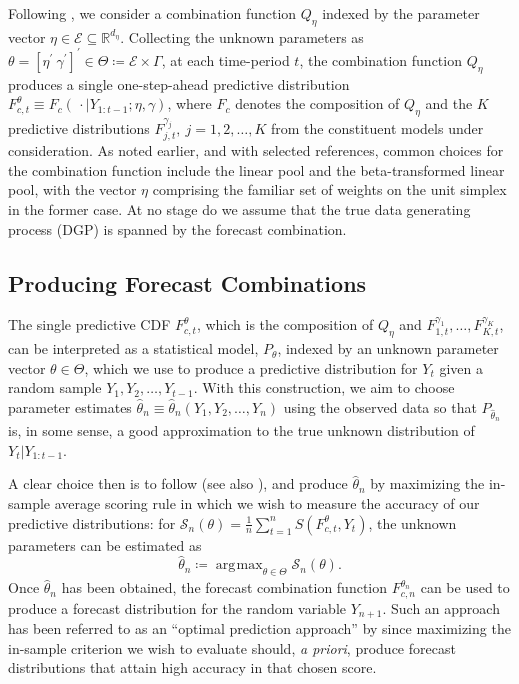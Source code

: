 \documentclass[12pt]{article}
\theoremstyle{definition}
\theoremstyle{remark}
\DeclareMathOperator*{\argmax}{\arg\!\max}
\begin{document}
{Following \cite{Gneiting2013}, we consider a combination function $Q_{\eta}$ indexed by the parameter vector $\eta \in \mathcal{E}\subseteq \mathbb{R}^{d_{\eta }}$. Collecting the unknown parameters as $\theta = [\eta^{\prime}\ \gamma^{\prime}]^{\prime} \in \Theta \coloneqq \mathcal{E} \times \Gamma$, at each time-period $t$, the combination function $Q_{\eta }$ produces a single one-step-ahead predictive distribution $F_{c,t}^{\theta} \equiv F_{c}(\,\cdot \mid Y_{1:t-1};\eta, \gamma)$, where $F_{c}$ denotes the composition of $Q_{\eta }$ and the $K$ predictive distributions $F_{j,t}^{\gamma _{j}},\ j=1,2,\ldots ,K$ from the constituent models under consideration. As noted earlier, and with selected references, common choices for the combination function include the linear pool and the beta-transformed linear pool, with the vector $\eta$ comprising the familiar set of weights on the unit simplex in the former case. At no stage do we assume that the true data generating process (DGP) is spanned by the forecast combination.

\subsection{Producing Forecast Combinations\label{subsec:produce}}

The single predictive CDF $F_{c,t}^{\theta}$, which is the composition of $Q_{\eta}$ and $F_{1,t}^{\gamma_{1}},\ldots,F_{K,t}^{\gamma_{K}}$, can be interpreted as a statistical model, $P_{\theta}$, indexed by an unknown parameter vector $\theta \in \Theta$, which we use to produce a predictive distribution for $Y_{t}$ given a random sample $Y_{1}, Y_{2}, \ldots, Y_{t-1}$. With this construction, we aim to choose parameter estimates $\hat{\theta}_{n} \equiv \hat{\theta}_{n}(Y_{1}, Y_{2}, \ldots, Y_{n})$ using the observed data so that $P_{\hat{\theta}_{n}}$ is, in some sense, a good approximation to the true unknown distribution of $Y_{t}|Y_{1:t-1}$.

A clear choice then is to follow \cite{Gneiting2007} (see also \citealp{Martin2021}), and produce $\hat{\theta}_{n}$ by maximizing the in-sample average scoring rule in which we wish to measure the accuracy of our predictive distributions: for $\mathcal{S}_{n}(\theta) = \frac{1}{n} \sum_{t=1}^{n} S(F_{c,t}^{\theta}, Y_{t})$, the unknown parameters can be estimated as 
\begin{equation}
\hat{\theta}_{n} \coloneqq \argmax_{\theta \in \Theta} \mathcal{S}_{n}(\theta). \label{eqn:est1s}
\end{equation}
Once $\hat{\theta}_{n}$ has been obtained, the forecast combination function $F_{c,n}^{\hat{\theta}_{n}}$ can be used to produce a forecast distribution for the random variable $Y_{n+1}$. Such an approach has been referred to as an ``optimal prediction approach'' by \cite{Gneiting2007} since maximizing the in-sample criterion we wish to evaluate should, \textit{a priori}, produce forecast distributions that attain high accuracy in that chosen score.

}
\end{document}
